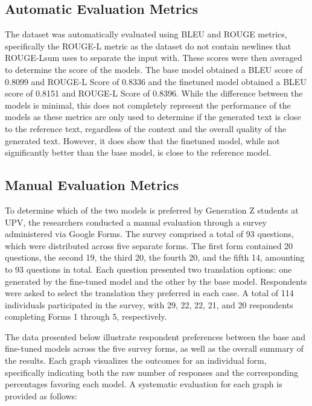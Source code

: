 \subsection{Automatic Evaluation Metrics}
The dataset was automatically evaluated using BLEU and ROUGE metrics, specifically the ROUGE-L metric as the dataset do not contain newlines that ROUGE-Lsum uses to separate the input with. These scores were then averaged to determine the score of the models. The base model obtained a BLEU score of 0.8099 and ROUGE-L Score of 0.8336 and the finetuned model obtained a BLEU score of 0.8151 and ROUGE-L Score of 0.8396. While the difference between the models is minimal, this does not completely represent the performance of the models as these metrics are only used to determine if the generated text is close to the reference text, regardless of the context and the overall quality of the generated text. However, it does show that the finetuned model, while not significantly better than the base model, is close to the reference model.

\subsection{Manual Evaluation Metrics}
To determine which of the two models is preferred by Generation Z students at UPV, the researchers conducted a manual evaluation through a survey administered via Google Forms. The survey comprised a total of 93 questions, which were distributed across five separate forms. The first form contained 20 questions, the second 19, the third 20, the fourth 20, and the fifth 14, amounting to 93 questions in total. Each question presented two translation options: one generated by the fine-tuned model and the other by the base model. Respondents were asked to select the translation they preferred in each case. A total of 114 individuals participated in the survey, with 29, 22, 22, 21, and 20 respondents completing Forms 1 through 5, respectively. 

The data presented below illustrate respondent preferences between the base and fine-tuned models across the five survey forms, as well as the overall summary of the results. Each graph visualizes the outcomes for an individual form, specifically indicating both the raw number of responses and the corresponding percentages favoring each model. A systematic evaluation for each graph is provided as follows:

